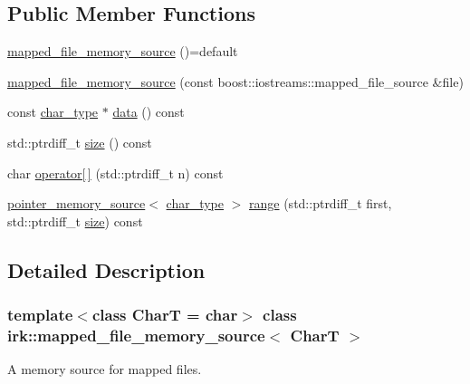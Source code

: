 \subsection*{Public Member Functions}
\begin{DoxyCompactItemize}
\item 
\mbox{\hyperlink{classirk_1_1mapped__file__memory__source_afda461084b8db2c179e990d8c8ab246c}{mapped\+\_\+file\+\_\+memory\+\_\+source}} ()=default
\item 
\mbox{\hyperlink{classirk_1_1mapped__file__memory__source_aa17e232c1b1496742f4709f369500d65}{mapped\+\_\+file\+\_\+memory\+\_\+source}} (const boost\+::iostreams\+::mapped\+\_\+file\+\_\+source \&file)
\item 
const \mbox{\hyperlink{classirk_1_1mapped__file__memory__source_a9b4319787fae825c6a27be1e58447386}{char\+\_\+type}} $\ast$ \mbox{\hyperlink{classirk_1_1mapped__file__memory__source_aed12180cbed20420b7d783b5a9705eb3}{data}} () const
\item 
std\+::ptrdiff\+\_\+t \mbox{\hyperlink{classirk_1_1mapped__file__memory__source_aa465b35d4c1ec9bc77337fec2cfd062d}{size}} () const
\item 
char \mbox{\hyperlink{classirk_1_1mapped__file__memory__source_a6e49ffba65ef2c28955d45d0fd50b4d4}{operator\mbox{[}$\,$\mbox{]}}} (std\+::ptrdiff\+\_\+t n) const
\item 
\mbox{\hyperlink{classirk_1_1pointer__memory__source}{pointer\+\_\+memory\+\_\+source}}$<$ \mbox{\hyperlink{classirk_1_1mapped__file__memory__source_a9b4319787fae825c6a27be1e58447386}{char\+\_\+type}} $>$ \mbox{\hyperlink{classirk_1_1mapped__file__memory__source_a9c7d09e97727c63b3b889ab03b13012e}{range}} (std\+::ptrdiff\+\_\+t first, std\+::ptrdiff\+\_\+t \mbox{\hyperlink{classirk_1_1mapped__file__memory__source_aa465b35d4c1ec9bc77337fec2cfd062d}{size}}) const
\end{DoxyCompactItemize}


\subsection{Detailed Description}
\subsubsection*{template$<$class CharT = char$>$\newline
class irk\+::mapped\+\_\+file\+\_\+memory\+\_\+source$<$ Char\+T $>$}

A memory source for mapped files. 


